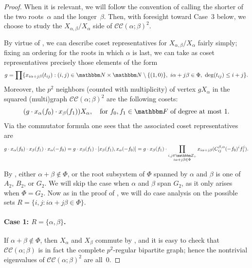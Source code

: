 \documentclass[10pt,a4paper]{article}
\theoremstyle{definition}
\newcommand{\N}{\mathbbm N}
\newcommand{\Z}{\mathbbm Z}
\newcommand{\F}{\mathbbm F}
\DeclarePairedDelimiter\parens{\lparen}{\rparen}
\newcommand{\CC}[2]{\mathcal{C}\mathcal{C}(#1;#2)}
\begin{document}
\begin{proof}
    When it is relevant, we will follow the convention of calling the shorter of the two roots~$\alpha$ and the longer~$\beta$.  
    Then, with foresight toward Case~3 below, we choose to study the $X_{\alpha,\beta}/X_\alpha$ side of $\CC{\alpha}{\beta}^2$.  
    
    By virtue of , we can describe coset representatives for $X_{\alpha,\beta}/X_\alpha$ fairly simply; fixing an ordering for the roots in which $\alpha$ is last, we can take as coset representatives precisely those elements of the form
    \begin{equation}    \label{eqn:coset1}
        g = \prod\{x_{i \alpha + j \beta}(t_{ij}) : (i,j) \in \N \times \N \setminus \{(1,0)\},\ i\alpha+j\beta \in \Phi,\ \deg(t_{ij}) \leq i + j\}.
    \end{equation}
    Moreover, the $p^2$ neighbors (counted with multiplicity) of vertex $gX_\alpha$ in the squared (multi)graph $\CC{\alpha}{\beta}^2$ are the following cosets:
    \[
        \parens*{g \cdot x_{\alpha}(f_0) \cdot x_\beta(f_1)}X_{\alpha}, \quad \text{for } f_0, f_1 \in \F \text{ of degree at most $1$}.
    \]
    Via the commutator formula one sees that the associated coset representatives are
    \begin{equation}    \label{eqn:coset2}
        g \cdot x_{\alpha}(f_0) \cdot x_\beta(f_1) \cdot x_{\alpha}(-f_0)  = g \cdot x_\beta(f_1) \cdot [x_\beta(f_1),x_{\alpha}(-f_0)] = g \cdot x_\beta(f_1) \cdot \prod_{\substack{i,j \in \Z_+ \\ i \alpha + j \beta \in \Phi}} x_{i\alpha+j\beta}(C_{ij}^{\beta,\alpha} (-f_0)^i f_1^j).
    \end{equation}

    By , either $\alpha+\beta \notin \Phi$, or the root subsystem of $\Phi$ spanned by $\alpha$ and $\beta$ is one of $A_2$, $B_2$, or $G_2$. We will skip the case when $\alpha$ and $\beta$ span $G_2$, as it only arises when $\Phi = G_2$. Now as in the proof of , we will do case analysis on the possible sets $R = \{i,j : i\alpha + j\beta \in \Phi\}$.

    \paragraph{Case 1: $R = \{\alpha,\beta\}$.}   If $\alpha+\beta \notin \Phi$, then $X_\alpha$ and $X_\beta$ commute by , and it is easy to check that $\CC{\alpha}{\beta}$ is in fact the complete $p^2$-regular bipartite graph; hence the nontrivial eigenvalues of $\CC{\alpha}{\beta}^2$ are all~$0$.
    

\end{proof}
\end{document}
